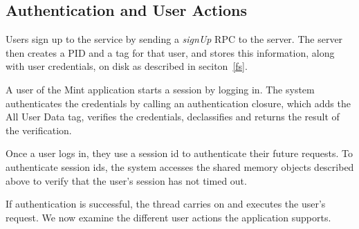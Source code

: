 \subsection{Authentication and User Actions}

Users sign up to the service by sending a \emph{signUp} RPC to the server. The server then creates a PID and a tag for that user, and stores this information, along with user credentials, on disk as described in seciton~\ref{fs}.

A user of the Mint application starts a session by logging in. The system authenticates the credentials by calling an authentication closure, which adds the All User Data tag, verifies the credentials, declassifies and returns the result of the verification.

Once a user logs in, they use a session id to authenticate their future requests. To authenticate session ids, the system accesses the shared memory objects described above to verify that the user's session has not timed out.

If authentication is successful, the thread carries on and executes the user's request. We now examine the different user actions the application supports.

